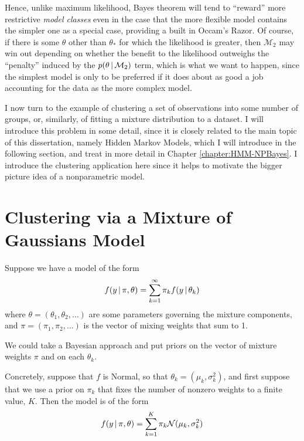 Hence, unlike maximum likelihood, 
Bayes theorem will tend to ``reward'' more restrictive {\em model
  classes} even in the case that the more flexible model contains the
simpler one as a special case, providing a built in Occam's Razor.
Of course, if there is some $\theta$ other than $\theta_*$ for which
the likelihood is greater, then $\mathcal{M}_2$ may win out depending
on whether the benefit to the likelihood outweighs the ``penalty''
induced by the $p(\theta \, \vert \, \mathcal{M}_2)$ term, which is what we
want to happen, since the simplest model is only to be preferred if it
does about as good a job accounting for the data as the more complex model.

I now turn to the example of clustering a set of observations into
some number of groups, or, similarly, of fitting a mixture
distribution to a dataset.  I will introduce this problem in some
detail, since it is closely related to the main topic of this
dissertation, namely Hidden Markov Models, which I will introduce in
the following section, and treat in more detail in
Chapter \ref{chapter:HMM-NPBayes}.  I introduce the clustering
application here since it helps to motivate the bigger picture idea of
a nonparametric model.

\section{Clustering via a Mixture of Gaussians Model}
\label{sec:clustering}

Suppose we have a model of the form
\begin{equation}
  \label{eq:gmm}
  f(y \, \vert \, \pi, \theta) = \sum_{k=1}^\infty \pi_k f(y \, \vert \, \theta_k)
\end{equation}
where $\theta = (\theta_1, \theta_2, \dots)$ are some parameters
governing the mixture components, and $\pi = (\pi_1, \pi_2, \dots)$ is
the vector of mixing weights that sum to 1.

We could take a Bayesian approach and put priors on the vector of
mixture weights $\pi$ and on each
$\theta_k$.

Concretely, suppose that $f$ is Normal, so that $\theta_k = (\mu_k,
\sigma^2_k)$, and first suppose that we use a prior on $\pi_k$ that
fixes the number of nonzero weights to a finite value, $K$.  
Then the model is of the form
\begin{equation}
  f(y \, \vert \, \pi, \theta) = \sum_{k=1}^K \pi_k \mathcal{N}(\mu_k,\sigma^2_k)
\end{equation}

